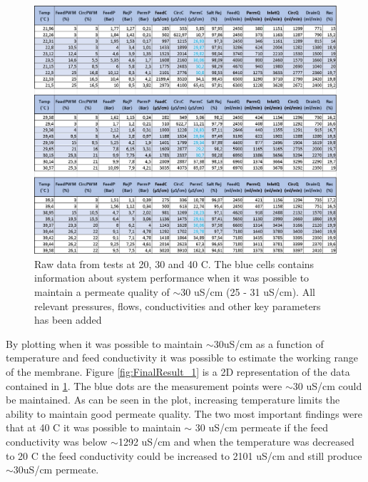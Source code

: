 \begin{figure}[H]
    \centering
    \includegraphics[width=1.1\textwidth]{Excel_plane}
    \caption{Raw data from tests at 20, 30 and 40 C. The blue cells contains information about system performance when it was possible to maintain a permeate quality of $\sim$30 uS/cm (25 - 31 uS/cm).  All relevant pressures, flows, conductivities and other key parameters has been added}
    \label{fig:Excel_plane}
\end{figure}

\newpage

By plotting when it was possible to maintain $\sim$30uS/cm as a function of temperature and feed conductivity it was possible to estimate the working range of the membrane. Figure \ref{fig:FinalResult_1} is a 2D representation of the data contained in \ref{fig:Excel_plane}. The blue dots are the measurement points were  $\sim$30 uS/cm could be maintained. As can be seen in the plot, increasing temperature limits the ability to maintain good permeate quality. The two most important findings were that at 40 C it was possible to maintain  $\sim$ 30 uS/cm permeate if the feed conductivity was below  $\sim$1292 uS/cm and when the temperature was decreased to 20 C the feed conductivity could be increased to 2101 uS/cm and still produce  $\sim$30uS/cm permeate.   

